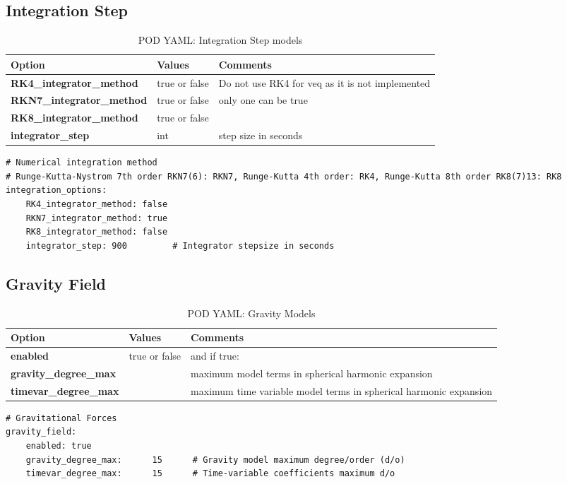 \subsection{Integration Step}
\begin{table}[h!]
	\begin{tabular}{|p{4.5cm}|p{2cm}|p{3.5cm}|}
		\hline
		Option & Values & Comments \\
		\hline
		\textbf{RK4\_integrator\_method} & true or false &  Do not use RK4 for veq as it is not implemented\\ 
		\textbf{RKN7\_integrator\_method} & true or false & only one can be true\\ 
		\textbf{RK8\_integrator\_method}  & true or false & \\
		\hline
		\textbf{integrator\_step} & int & step size in seconds \\
		\hline
	\end{tabular}
	\caption{POD YAML: Integration Step models}
	\label{table:pod_yaml_integration_step}
\end{table}
%

\begin{lstlisting}[language=xml,caption=yaml example for gravitational force model options]
# Numerical integration method
# Runge-Kutta-Nystrom 7th order RKN7(6): RKN7, Runge-Kutta 4th order: RK4, Runge-Kutta 8th order RK8(7)13: RK8
integration_options:
	RK4_integrator_method: false
	RKN7_integrator_method: true
	RK8_integrator_method: false
	integrator_step: 900         # Integrator stepsize in seconds	
\end{lstlisting}

\subsection{Gravity Field}
\begin{table}[h!]
	\begin{tabular}{|p{4.5cm}|p{2cm}|p{3.5cm}|}
		\hline
		Option & Values & Comments \\
		\hline
		\textbf{enabled} & true or false & and if true:\\
		\textbf{gravity\_degree\_max} &  & maximum model terms in spherical harmonic expansion \\ 
		\textbf{timevar\_degree\_max} &  & maximum time variable model terms in spherical harmonic expansion \\
		\hline
	\end{tabular}
	\caption{POD YAML: Gravity Models}
	\label{table:label_name}
\end{table}
%
\begin{lstlisting}[language=xml,caption=yaml example for gravitational force model options]
# Gravitational Forces
gravity_field:
	enabled: true
	gravity_degree_max:      15      # Gravity model maximum degree/order (d/o)
	timevar_degree_max:      15      # Time-variable coefficients maximum d/o
\end{lstlisting}
%
